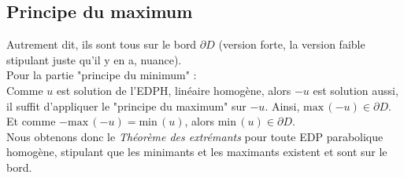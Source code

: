 \documentclass[11pt, a4paper, openany]{book}
\begin{document}
			\subsection{Principe du maximum}
			Autrement dit, ils sont tous sur le bord $\partial D$ (version forte, la version faible stipulant juste qu'il y en a, nuance).\\
			Pour la partie "principe du minimum" :\\
																	
			Comme $u$ est solution de l'EDPH, linéaire homogène, alors $-u$ est solution aussi, il suffit d'appliquer le "principe du maximum" sur $-u$. Ainsi, $\text{max}\,(-u)\in\partial D$. Et comme $-\text{max}\,(-u)=\text{min}\,(u)$, alors $\text{min}\,(u)\in\partial D$.\\
																	
			Nous obtenons donc le \textit{Théorème des extrémants} pour toute EDP parabolique homogène, stipulant que les minimants et les maximants existent et sont sur le bord.
																	
			\setcounter{subsection}{2}
\end{document}
